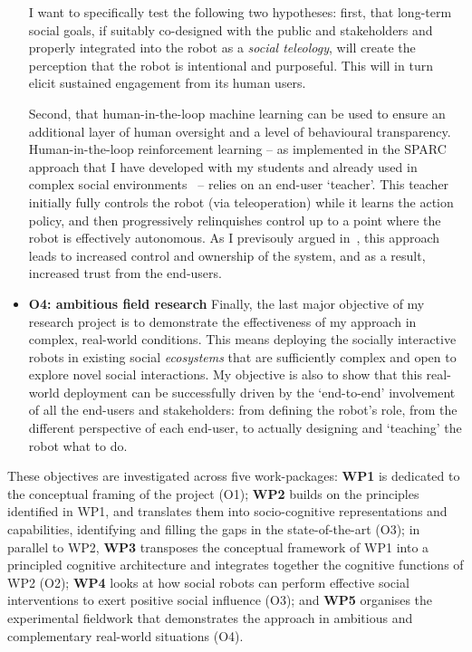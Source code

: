\begin{itemize}
        I want to specifically test the following two hypotheses: first, that
        long-term social goals, if suitably co-designed with the public and
        stakeholders and properly integrated into the robot as a \emph{social
        teleology}, will create the perception that the robot is intentional and
        purposeful. This will in turn elicit sustained engagement from its human
        users.

        Second, that human-in-the-loop machine learning can be used to ensure an
        additional layer of human oversight and a level of behavioural
        transparency.  Human-in-the-loop reinforcement learning -- as
        implemented in the SPARC approach that I have developed with my students
        and already used in complex social
        environments~\parencite{senft2017supervised,senft2019teaching,winkle2020insitu}
        -- relies on an end-user `teacher'. This teacher initially fully
        controls the robot (via teleoperation) while it learns the action
        policy, and then progressively relinquishes control up to a point where
        the robot is effectively autonomous. As I previsouly argued
        in~\textcite{senft2019teaching}, this approach leads to increased
        control and ownership of the system, and as a result, increased trust
        from the end-users.


    \item{\bf O4: ambitious field research} Finally, the last major objective of
        my research project is to demonstrate the effectiveness of my approach
        in complex, real-world conditions. This means deploying the socially
        interactive robots in existing social \emph{ecosystems} that are
        sufficiently complex and open to explore novel social interactions. My
        objective is also to show that this real-world deployment can be
        successfully driven by the `end-to-end' involvement of all the end-users
        and stakeholders: from defining the robot's role, from the different
        perspective of each end-user, to actually designing and `teaching' the
        robot what to do.


\end{itemize}


These objectives are investigated across five work-packages: \textbf{WP1}
is dedicated to the conceptual framing of the project (O1); \textbf{WP2} builds
on the principles identified in WP1, and translates them into socio-cognitive
representations and capabilities, identifying and filling the gaps in the
state-of-the-art (O3); in parallel to WP2, \textbf{WP3} transposes the
conceptual framework of WP1 into a principled cognitive architecture and
integrates together the cognitive functions of WP2 (O2); \textbf{WP4} looks at
how social robots can perform effective social interventions to exert positive
social influence (O3); and \textbf{WP5} organises the experimental fieldwork
that demonstrates the \project approach in ambitious and
complementary real-world situations (O4).

